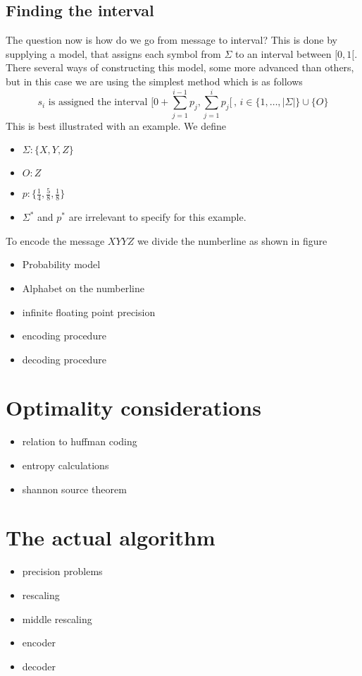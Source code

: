 \subsection{Finding the interval}
The question now is how do we go from message to interval? This is done by supplying a model, that assigns each symbol from $\Sigma$ to an interval between $[0,1[$. There several ways of constructing this model, some more advanced than others, but in this case we are using the simplest method which is as follows
\begin{equation}
    s_i \text{ is assigned the interval } [0 +\sum_{j=1}^{i-1}p_j, \sum_{j=1}^i p_j [\,,\,i \in \{1,\dots,|\Sigma|\} \cup \{O\}
\end{equation}
This is best illustrated with an example. We define
\begin{itemize}
    \item $\Sigma : \{X,Y,Z\}$
    \item $O : Z$
    \item $p : \{\frac{1}{4},\frac{5}{8},\frac{1}{8}\}$
    \item $\Sigma^*$ and $p^*$ are irrelevant to specify for this example.
\end{itemize}

To encode the message $XYYZ$ we divide the numberline as shown in figure 



\begin{itemize}
    \item Probability model
    \item Alphabet on the numberline
    \item infinite floating point precision
    \item encoding procedure
    \item decoding procedure
\end{itemize}

\section{Optimality considerations}
\begin{itemize}
    \item relation to huffman coding
    \item entropy calculations
    \item shannon source theorem
\end{itemize}

\section{The actual algorithm}
\begin{itemize}
    \item precision problems
    \item rescaling
    \item middle rescaling
    \item encoder
    \item decoder
\end{itemize}